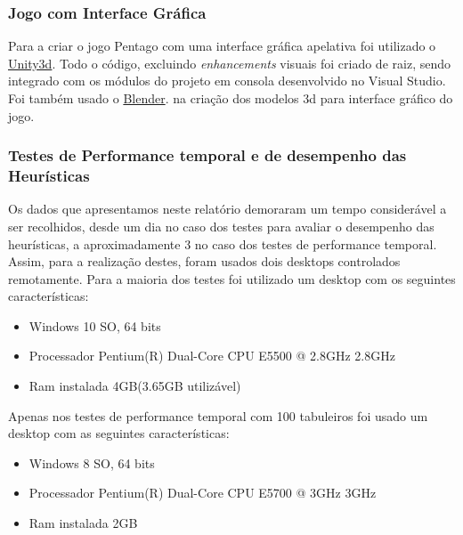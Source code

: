 \subsubsection{Jogo com Interface Gráfica}

Para a criar o jogo Pentago com uma interface gráfica apelativa foi utilizado o \href{https://unity3d.com/pt}{Unity3d}. Todo o código, excluindo \emph{enhancements} visuais foi criado de raiz, sendo integrado com os módulos do projeto em consola desenvolvido no Visual Studio. 
Foi também usado o \href{https://www.blender.org/}{Blender}. na criação dos modelos 3d para interface gráfico do jogo.

\subsubsection{Testes de Performance temporal e de desempenho das Heurísticas}

Os dados que apresentamos neste relatório demoraram um tempo considerável a ser recolhidos, desde um dia no caso dos testes para avaliar o desempenho das heurísticas, a aproximadamente 3 no caso dos testes de performance temporal. Assim, para a realização destes, foram usados dois desktops controlados remotamente. Para a maioria dos testes foi utilizado um desktop com os seguintes características:
\begin{itemize}
\item Windows 10 SO, 64 bits
\item Processador Pentium(R) Dual-Core CPU E5500 @ 2.8GHz 2.8GHz 
\item Ram instalada 4GB(3.65GB utilizável)
\end{itemize}
Apenas nos testes de performance temporal com 100 tabuleiros foi usado um desktop com as seguintes características: 
\begin{itemize}
\item Windows 8 SO, 64 bits
\item Processador Pentium(R) Dual-Core CPU E5700 @ 3GHz 3GHz 
\item Ram instalada 2GB
\end{itemize}


